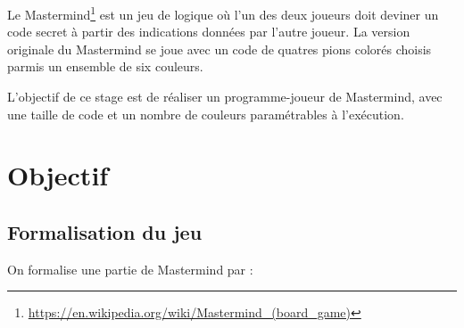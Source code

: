 \documentclass[a4paper]{article}
\renewcommand{\(}{\begin{math}\color{brick}}
\renewcommand{\)}{\end{math}}
\begin{document}
Le Mastermind\footnote{\url{https://en.wikipedia.org/wiki/Mastermind_(board_game)}} est un jeu de logique où l'un des deux joueurs doit deviner un code secret à partir des indications données par l'autre joueur. La version originale du Mastermind se joue avec un code de quatres pions colorés choisis parmis un ensemble de six couleurs.

L'objectif de ce stage est de réaliser un programme-joueur de Mastermind, avec une taille de code et un nombre de couleurs paramétrables à l'exécution.

\section{Objectif}

\subsection{Formalisation du jeu}

On formalise une partie de Mastermind par :
\end{document}
